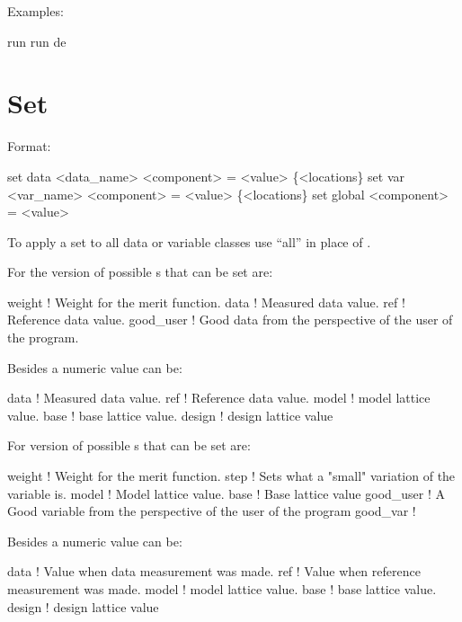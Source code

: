 Examples:
\begin{example}
  run 
  run de
\end{example}

\section{Set}
\label{s:set}

Format:
\begin{example}
  set data <data_name> <component> = <value> \{<locations\}
  set var <var_name> <component> = <value> \{<locations\}
  set global <component> = <value>
\end{example}

\vskip 0.2in
To apply a set to all data or variable classes use ``all''
in place of .

For the  version of  possible 
s that can be set are:
\begin{example}
  weight      ! Weight for the merit function.
  data        ! Measured data value.
  ref         ! Reference data value.
  good_user   ! Good data from the perspective of the user of the \tao program.
\end{example}
Besides a numeric value  can be:
\begin{example}
  data        ! Measured data value.
  ref         ! Reference data value.
  model       ! model lattice value.
  base        ! base lattice value.
  design      ! design lattice value
\end{example}

For  version of  possible 
s that can be set are:
\begin{example}
  weight     ! Weight for the merit function.
  step       ! Sets what a "small" variation of the variable is.
  model      ! Model lattice value.
  base       ! Base lattice value
  good_user  ! A Good variable from the perspective of the user of the \tao program
  good_var   ! 
\end{example}
Besides a numeric value  can be:
\begin{example}
  data        ! Value when data measurement was made.
  ref         ! Value when reference measurement was made.
  model       ! model lattice value.
  base        ! base lattice value.
  design      ! design lattice value
\end{example}

